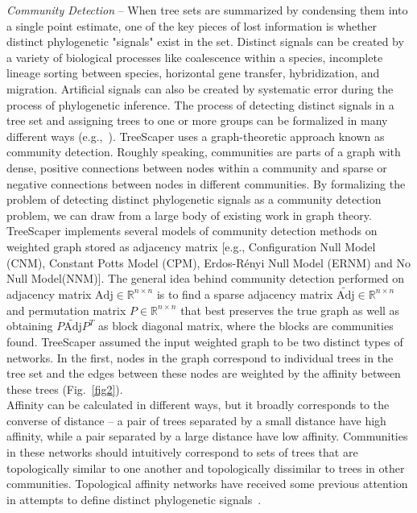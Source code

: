\documentclass[11pt]{article}
\begin{document}
	
	
{\it Community Detection} -- When tree sets are summarized by condensing them into a single point estimate, one of the key pieces of lost information is whether distinct phylogenetic "signals" exist in the set. Distinct signals can be created by a variety of biological processes like coalescence within a species, incomplete lineage sorting between species, horizontal gene transfer, hybridization, and migration. Artificial signals can also be created by systematic error during the process of phylogenetic inference. The process of detecting distinct signals in a tree set and assigning trees to one or more groups can be formalized in many different ways (e.g.,~\citep{GSAGD:2015,LM:2016}). TreeScaper uses a graph-theoretic approach known as community detection. Roughly speaking, communities are parts of a graph with dense, positive connections between nodes within a community and sparse or negative connections between nodes in different communities. By formalizing the problem of detecting distinct phylogenetic signals as a community detection problem, we can draw from a large body of existing work in graph theory. \\


TreeScaper implements several models of community detection methods on weighted graph stored as adjacency matrix [e.g., Configuration Null Model (CNM), Constant Potts Model (CPM), Erdos-Rényi Null Model (ERNM) and No Null Model(NNM)]. The general idea behind community detection performed on adjacency matrix $\text{Adj}\in \mathbb{R}^{n\times n}$ is to find a sparse adjacency matrix $\widetilde{\text{Adj}} \in \mathbb{R}^{n\times n}$ and permutation matrix $P\in \mathbb{R}^{n\times n}$ that best preserves the true graph as well as obtaining $P\widetilde{\text{Adj}}P^T$ as block diagonal matrix, where the blocks are communities found. TreeScaper assumed the input weighted graph to be two distinct types of networks. In the first, nodes in the graph correspond to individual trees in the tree set and the edges between these nodes are weighted by the affinity between these trees (Fig.~\ref{fig2}). \\


Affinity can be calculated in different ways, but it broadly corresponds to the converse of distance -- a pair of trees separated by a small distance have high affinity, while a pair separated by a large distance have low affinity. Communities in these networks should intuitively correspond to sets of trees that are topologically similar to one another and topologically dissimilar to trees in other communities. Topological affinity networks have received some previous attention in attempts to define distinct phylogenetic signals~\citep{SWW:2002,GSAGD:2015,LM:2016}. \\
\end{document}
